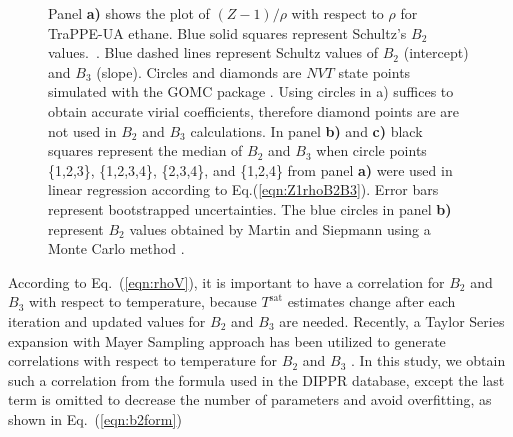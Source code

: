 \documentclass[5p,times]{elsarticle}
\begin{document}
\begin{figure}
\caption{
Panel \textbf{a)} shows the plot of $(Z-1)/\rho$ with respect to $\rho$ for TraPPE-UA ethane. Blue solid squares represent Schultz's $B_2$ values.~\cite{Schultz2010a}. Blue dashed lines represent Schultz values of $B_2$ (intercept) and $B_3$ (slope). Circles and diamonds are $NVT$ state points simulated with the GOMC package \cite{Mick2013}. Using circles in a) suffices to obtain accurate virial coefficients, therefore diamond points are are not used in $B_2$ and $B_3$ calculations. In panel \textbf{b)} and \textbf{c)} black squares represent the median of $B_2$ and $B_3$ when circle points \{1,2,3\}, \{1,2,3,4\}, \{2,3,4\}, and \{1,2,4\} from panel \textbf{a)} were used in linear regression according to Eq.(\ref{eqn:Z1rhoB2B3}). Error bars represent bootstrapped uncertainties. The blue circles in panel \textbf{b)} represent $B_2$ values obtained by Martin and Siepmann \cite{Martin1998} using a Monte Carlo method \cite{Harismiadis1994}.
}
\label{fig:TraPPE-C2-Z1rho-B2-B3}
\end{figure}

According to Eq.~(\ref{eqn:rhoV}), it is important to have a correlation for $B_2$ and $B_3$ with respect to temperature, because $T^\mathrm{sat}$ estimates change after each iteration and updated values for $B_2$ and $B_3$ are needed. Recently, a Taylor Series expansion with Mayer Sampling approach has been utilized to generate correlations with respect to temperature for $B_2$ and $B_3$ \cite{Hatch2017}. In this study, we obtain such a correlation from the formula used in the DIPPR \cite{DIPPR2004} database, except the last term is omitted to decrease the number of parameters and avoid overfitting, as shown in Eq.~(\ref{eqn:b2form}) 
\end{document}
